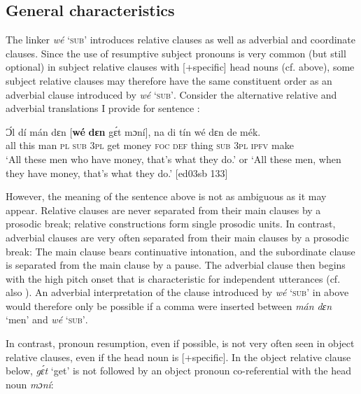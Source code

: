 \subsection{General characteristics}\label{sec:10.6.1}

The linker \textit{wé} ‘\textsc{sub}’ introduces relative clauses as well as adverbial and coordinate clauses. Since the use of resumptive subject pronouns is very common (but still optional) in subject relative clauses with [+specific] head nouns (cf.  above), some subject relative clauses may therefore have the same constituent order as an adverbial clause introduced by \textit{wé} ‘\textsc{sub’}. Consider the alternative relative and adverbial translations I provide for sentence :


\ea%
    \label{ex:key:1420}
    \gll Ɔ́l  dí  mán    dɛn  [\textbf{wé}  \textbf{dɛn}  gɛ́t  mɔní],  na  di  tín
wé  dɛn  de  mék.\\
all  this  man    \textsc{pl}   \phantom{[}\textsc{sub}  \textsc{3pl}  get  money    \textsc{foc}  \textsc{def}  thing
\textsc{sub}  \textsc{3pl}  \textsc{ipfv}  make\\

\glt ‘All these men who have money, that’s what they do.’ or 
‘All these men, when they have money, that’s what they do.’ [ed03sb 133]
\z

However, the meaning of the sentence above is not as ambiguous as it may appear. Relative clauses are never separated from their main clauses by a prosodic break; relative constructions form single prosodic units. In contrast, adverbial clauses are very often separated from their main clauses by a prosodic break: The main clause bears continuative intonation, and the subordinate clause is separated from the main clause by a pause. The adverbial clause then begins with the high pitch onset that is characteristic for independent utterances (cf. also ). An adverbial interpretation of the clause introduced by \textit{wé} ‘\textsc{sub’} in  above would therefore only be possible if a comma were inserted between \textit{mán dɛn} ‘men’ and \textit{wé} ‘\textsc{sub’}. 


In contrast, pronoun resumption, even if possible, is not very often seen in object relative clauses, even if the head noun is [+specific]. In the object relative clause below, \textit{gɛ́t} ‘get’ is not followed by an object pronoun co-referential with the head noun \textit{mɔní}:



